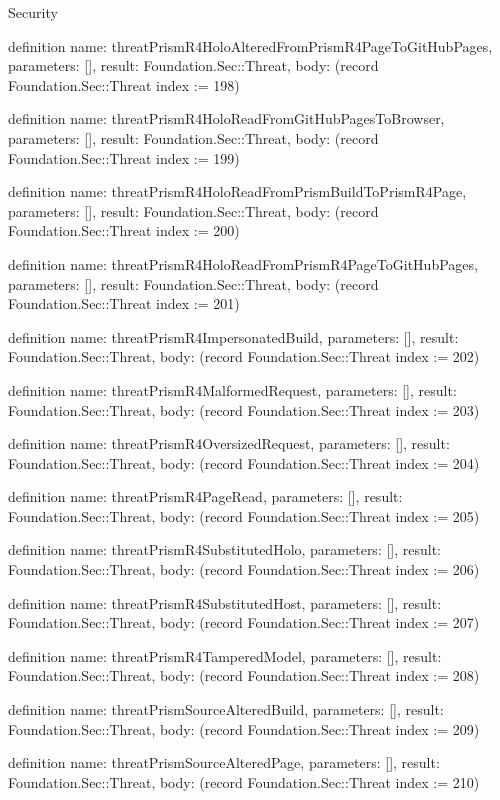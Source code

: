\begin{lexlean}{Security}
\begin{semanticmodule}
definition{
  name: threatPrismR4HoloAlteredFromPrismR4PageToGitHubPages,
  parameters: [],
  result: Foundation.Sec::Threat,
  body: (record Foundation.Sec::Threat {index := 198})
}

definition{
  name: threatPrismR4HoloReadFromGitHubPagesToBrowser,
  parameters: [],
  result: Foundation.Sec::Threat,
  body: (record Foundation.Sec::Threat {index := 199})
}

definition{
  name: threatPrismR4HoloReadFromPrismBuildToPrismR4Page,
  parameters: [],
  result: Foundation.Sec::Threat,
  body: (record Foundation.Sec::Threat {index := 200})
}

definition{
  name: threatPrismR4HoloReadFromPrismR4PageToGitHubPages,
  parameters: [],
  result: Foundation.Sec::Threat,
  body: (record Foundation.Sec::Threat {index := 201})
}

definition{
  name: threatPrismR4ImpersonatedBuild,
  parameters: [],
  result: Foundation.Sec::Threat,
  body: (record Foundation.Sec::Threat {index := 202})
}

definition{
  name: threatPrismR4MalformedRequest,
  parameters: [],
  result: Foundation.Sec::Threat,
  body: (record Foundation.Sec::Threat {index := 203})
}

definition{
  name: threatPrismR4OversizedRequest,
  parameters: [],
  result: Foundation.Sec::Threat,
  body: (record Foundation.Sec::Threat {index := 204})
}

definition{
  name: threatPrismR4PageRead,
  parameters: [],
  result: Foundation.Sec::Threat,
  body: (record Foundation.Sec::Threat {index := 205})
}

definition{
  name: threatPrismR4SubstitutedHolo,
  parameters: [],
  result: Foundation.Sec::Threat,
  body: (record Foundation.Sec::Threat {index := 206})
}

definition{
  name: threatPrismR4SubstitutedHost,
  parameters: [],
  result: Foundation.Sec::Threat,
  body: (record Foundation.Sec::Threat {index := 207})
}

definition{
  name: threatPrismR4TamperedModel,
  parameters: [],
  result: Foundation.Sec::Threat,
  body: (record Foundation.Sec::Threat {index := 208})
}

definition{
  name: threatPrismSourceAlteredBuild,
  parameters: [],
  result: Foundation.Sec::Threat,
  body: (record Foundation.Sec::Threat {index := 209})
}

definition{
  name: threatPrismSourceAlteredPage,
  parameters: [],
  result: Foundation.Sec::Threat,
  body: (record Foundation.Sec::Threat {index := 210})
}


\end{semanticmodule}
\end{lexlean}
